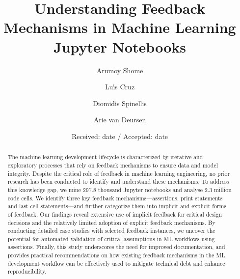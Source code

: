 \documentclass[smallextended]{svjour3}       %
\begin{document}
\title{Understanding Feedback Mechanisms in Machine Learning Jupyter Notebooks}


\author{Arumoy Shome\and
	Lu{\'\i}s Cruz\and
	Diomidis Spinellis\and
	Arie van Deursen
}



\date{Received: date / Accepted: date}


\maketitle

\begin{abstract}
	The machine learning development lifecycle is characterized by iterative and exploratory processes that rely on feedback mechanisms to ensure data and model integrity. Despite the critical role of feedback in machine learning engineering, no prior research has been conducted to identify and understand these mechanisms. To address this knowledge gap, we mine 297.8 thousand Jupyter notebooks and analyse 2.3 million code cells. We identify three key feedback mechanisms---assertions, print statements and last cell statements---and further categorize them into implicit and explicit forms of feedback. Our findings reveal extensive use of implicit feedback for critical design decisions and the relatively limited adoption of explicit feedback mechanisms. By conducting detailed case studies with selected feedback instances, we uncover the potential for automated validation of critical assumptions in ML workflows using assertions. Finally, this study underscores the need for improved documentation, and provides practical recommendations on how existing feedback mechanisms in the ML development workflow can be effectively used to mitigate technical debt and enhance reproducibility.
\end{abstract}
\end{document}
